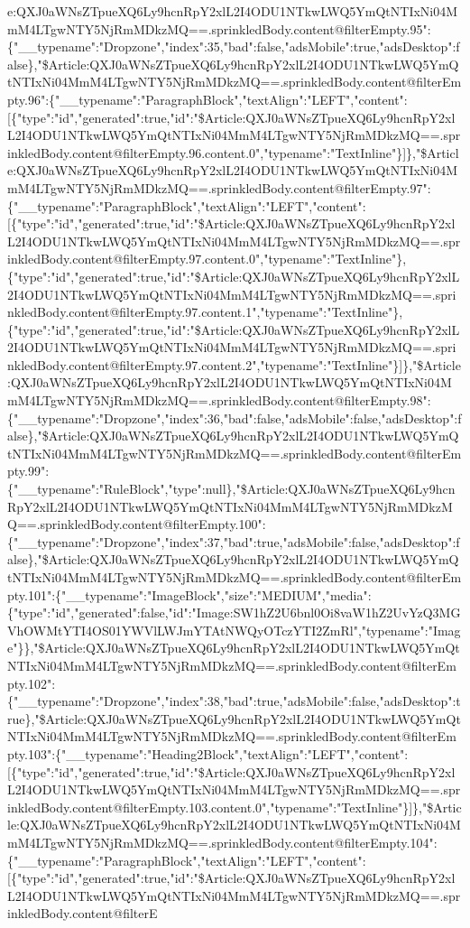 e:QXJ0aWNsZTpueXQ6Ly9hcnRpY2xlL2I4ODU1NTkwLWQ5YmQtNTIxNi04MmM4LTgwNTY5NjRmMDkzMQ==.sprinkledBody.content@filterEmpty.95":\{"\_\_typename":"Dropzone","index":35,"bad":false,"adsMobile":true,"adsDesktop":false\},"\$Article:QXJ0aWNsZTpueXQ6Ly9hcnRpY2xlL2I4ODU1NTkwLWQ5YmQtNTIxNi04MmM4LTgwNTY5NjRmMDkzMQ==.sprinkledBody.content@filterEmpty.96":\{"\_\_typename":"ParagraphBlock","textAlign":"LEFT","content":{[}\{"type":"id","generated":true,"id":"\$Article:QXJ0aWNsZTpueXQ6Ly9hcnRpY2xlL2I4ODU1NTkwLWQ5YmQtNTIxNi04MmM4LTgwNTY5NjRmMDkzMQ==.sprinkledBody.content@filterEmpty.96.content.0","typename":"TextInline"\}{]}\},"\$Article:QXJ0aWNsZTpueXQ6Ly9hcnRpY2xlL2I4ODU1NTkwLWQ5YmQtNTIxNi04MmM4LTgwNTY5NjRmMDkzMQ==.sprinkledBody.content@filterEmpty.97":\{"\_\_typename":"ParagraphBlock","textAlign":"LEFT","content":{[}\{"type":"id","generated":true,"id":"\$Article:QXJ0aWNsZTpueXQ6Ly9hcnRpY2xlL2I4ODU1NTkwLWQ5YmQtNTIxNi04MmM4LTgwNTY5NjRmMDkzMQ==.sprinkledBody.content@filterEmpty.97.content.0","typename":"TextInline"\},\{"type":"id","generated":true,"id":"\$Article:QXJ0aWNsZTpueXQ6Ly9hcnRpY2xlL2I4ODU1NTkwLWQ5YmQtNTIxNi04MmM4LTgwNTY5NjRmMDkzMQ==.sprinkledBody.content@filterEmpty.97.content.1","typename":"TextInline"\},\{"type":"id","generated":true,"id":"\$Article:QXJ0aWNsZTpueXQ6Ly9hcnRpY2xlL2I4ODU1NTkwLWQ5YmQtNTIxNi04MmM4LTgwNTY5NjRmMDkzMQ==.sprinkledBody.content@filterEmpty.97.content.2","typename":"TextInline"\}{]}\},"\$Article:QXJ0aWNsZTpueXQ6Ly9hcnRpY2xlL2I4ODU1NTkwLWQ5YmQtNTIxNi04MmM4LTgwNTY5NjRmMDkzMQ==.sprinkledBody.content@filterEmpty.98":\{"\_\_typename":"Dropzone","index":36,"bad":false,"adsMobile":false,"adsDesktop":false\},"\$Article:QXJ0aWNsZTpueXQ6Ly9hcnRpY2xlL2I4ODU1NTkwLWQ5YmQtNTIxNi04MmM4LTgwNTY5NjRmMDkzMQ==.sprinkledBody.content@filterEmpty.99":\{"\_\_typename":"RuleBlock","type":null\},"\$Article:QXJ0aWNsZTpueXQ6Ly9hcnRpY2xlL2I4ODU1NTkwLWQ5YmQtNTIxNi04MmM4LTgwNTY5NjRmMDkzMQ==.sprinkledBody.content@filterEmpty.100":\{"\_\_typename":"Dropzone","index":37,"bad":true,"adsMobile":false,"adsDesktop":false\},"\$Article:QXJ0aWNsZTpueXQ6Ly9hcnRpY2xlL2I4ODU1NTkwLWQ5YmQtNTIxNi04MmM4LTgwNTY5NjRmMDkzMQ==.sprinkledBody.content@filterEmpty.101":\{"\_\_typename":"ImageBlock","size":"MEDIUM","media":\{"type":"id","generated":false,"id":"Image:SW1hZ2U6bnl0Oi8vaW1hZ2UvYzQ3MGVhOWMtYTI4OS01YWVlLWJmYTAtNWQyOTczYTI2ZmRl","typename":"Image"\}\},"\$Article:QXJ0aWNsZTpueXQ6Ly9hcnRpY2xlL2I4ODU1NTkwLWQ5YmQtNTIxNi04MmM4LTgwNTY5NjRmMDkzMQ==.sprinkledBody.content@filterEmpty.102":\{"\_\_typename":"Dropzone","index":38,"bad":true,"adsMobile":false,"adsDesktop":true\},"\$Article:QXJ0aWNsZTpueXQ6Ly9hcnRpY2xlL2I4ODU1NTkwLWQ5YmQtNTIxNi04MmM4LTgwNTY5NjRmMDkzMQ==.sprinkledBody.content@filterEmpty.103":\{"\_\_typename":"Heading2Block","textAlign":"LEFT","content":{[}\{"type":"id","generated":true,"id":"\$Article:QXJ0aWNsZTpueXQ6Ly9hcnRpY2xlL2I4ODU1NTkwLWQ5YmQtNTIxNi04MmM4LTgwNTY5NjRmMDkzMQ==.sprinkledBody.content@filterEmpty.103.content.0","typename":"TextInline"\}{]}\},"\$Article:QXJ0aWNsZTpueXQ6Ly9hcnRpY2xlL2I4ODU1NTkwLWQ5YmQtNTIxNi04MmM4LTgwNTY5NjRmMDkzMQ==.sprinkledBody.content@filterEmpty.104":\{"\_\_typename":"ParagraphBlock","textAlign":"LEFT","content":{[}\{"type":"id","generated":true,"id":"\$Article:QXJ0aWNsZTpueXQ6Ly9hcnRpY2xlL2I4ODU1NTkwLWQ5YmQtNTIxNi04MmM4LTgwNTY5NjRmMDkzMQ==.sprinkledBody.content@filterE